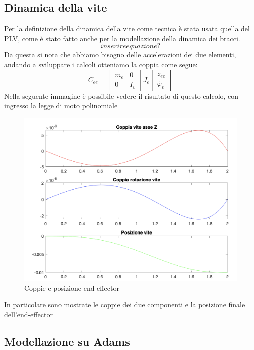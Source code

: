 \subsection{Dinamica della vite}
Per la definizione della dinamica della vite come tecnica è stata usata quella del PLV, come è stato fatto anche per la modellazione della dinamica dei bracci. 
\begin{equation*}
    inserire equazione?
\end{equation*}
Da questa si nota che abbiamo bisogno delle accelerazioni dei due elementi, andando a sviluppare i calcoli otteniamo la coppia come segue:
\begin{equation}
    C_{ee} = \begin{bmatrix}
    m_e & 0 \\ 0 & I_v
    \end{bmatrix}
    J_e \begin{bmatrix}
    \ddot{z_{ee}} \\ \ddot{\varphi_v}
    \end{bmatrix}
\end{equation}
Nella seguente immagine è possibile vedere il risultato di questo calcolo, con ingresso la legge di moto polinomiale
\begin{figure}[ht]
\begin{center}
    \includegraphics[scale=0.55]{Immagini/coppiaTeoricaVite.png}
    \caption{Coppie e posizione end-effector}
\end{center}
\end{figure}
In particolare sono mostrate le coppie dei due componenti e la posizione finale dell'end-effector
\subsection{Modellazione su Adams}